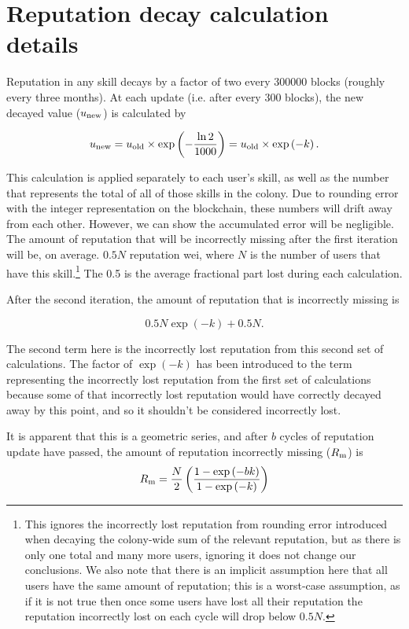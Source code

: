 \clearpage
\section{Reputation decay calculation details}\label{appendix:rep-decay}

Reputation in any skill decays by a factor of two every 300000 blocks (roughly every three months). At each update (i.e. after every 300 blocks), the new decayed value ($u_{\rm new}$) is calculated by

$$u_{\rm new} = u_{\rm old} \times \exp\left(-\frac{\ln 2}{1000}\right) = u_{\rm old} \times \exp\left(-k\right).$$


This calculation is applied separately to each user's skill, as well as the number that represents the total of all of those skills in the colony. Due to rounding error with the integer representation on the blockchain, these numbers will drift away from each other. However, we can show the accumulated error will be negligible. The amount of reputation that will be incorrectly missing after the first iteration will be, on average. $0.5N$ reputation wei, where $N$ is the number of users that have this skill.\footnote{This ignores the incorrectly lost reputation from rounding error introduced when decaying the colony-wide sum of the relevant reputation, but as there is only one total and many more users, ignoring it does not change our conclusions. We also note that there is an implicit assumption here that all users have the same amount of reputation; this is a worst-case assumption, as if it is not true then once some users have lost all their reputation the reputation incorrectly lost on each cycle will drop below $0.5N$.} The 0.5 is the average fractional part lost during each calculation.

After the second iteration, the amount of reputation that is incorrectly missing is

$$0.5N\exp\left(-k\right) + 0.5N.$$


The second term here is the incorrectly lost reputation from this second set of calculations. The factor of $\exp\left(-k\right)$ has been introduced to the term representing the incorrectly lost reputation from the first set of calculations because some of that incorrectly lost reputation would have correctly decayed away by this point, and so it shouldn't be considered incorrectly lost.

It is apparent that this is a geometric series, and after $b$ cycles of reputation update have passed, the amount of reputation incorrectly missing ($R_{\rm m}$) is
$$R_{\rm m} = \frac{N}{2} \left(\frac{1-\exp\left(-bk\right)}{1-\exp\left(-k\right)}\right)$$

